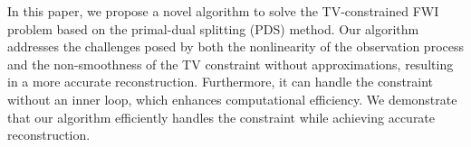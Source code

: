 In this paper, we propose a novel algorithm to solve the TV-constrained FWI problem based on the primal-dual splitting (PDS) method.
Our algorithm addresses the challenges posed by both the nonlinearity of the observation process and the non-smoothness of the TV constraint without approximations, resulting in a more accurate reconstruction.
Furthermore, it can handle the constraint without an inner loop, which enhances computational efficiency.
We demonstrate that our algorithm efficiently handles the constraint while achieving accurate reconstruction.

